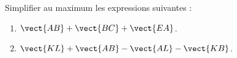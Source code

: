 
\begin{exercice}\label{exosmath-0465}

    Simplifier au maximum les expressions suivantes :
    \begin{enumerate}
        \item
            \( \vect{ AB }+\vect{ BC }+\vect{ EA }\).
        \item
            \( \vect{ KL }+\vect{ AB }-\vect{ AL }-\vect{ KB }\).
    \end{enumerate}

\end{exercice}
